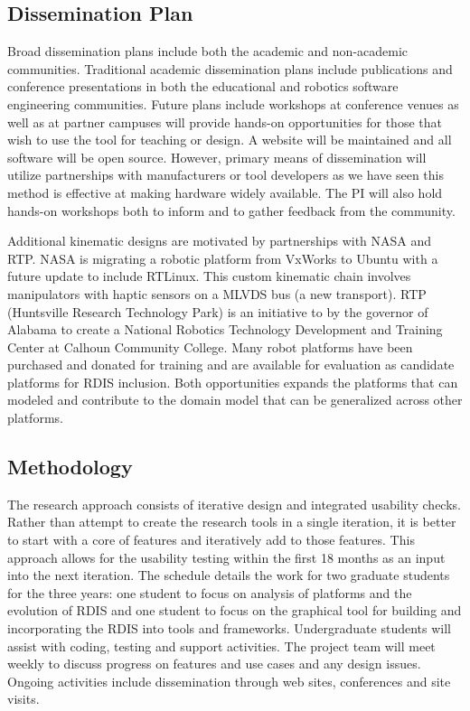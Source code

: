 \subsection{Dissemination Plan}
Broad dissemination plans include both the academic and non-academic communities.  Traditional academic dissemination plans include publications and conference presentations in both the educational and robotics software engineering communities.  Future plans include workshops at conference venues as well as at partner campuses will provide hands-on opportunities for those that wish to use the tool for teaching or design.  A website will be maintained and all software will be open source.  However, primary means of dissemination will utilize partnerships with manufacturers or tool developers as we have seen this method is effective at making hardware widely available.  The PI will also hold hands-on workshops both to inform and to gather feedback from the community.  

Additional kinematic designs are motivated by partnerships with NASA and RTP.  NASA is migrating a robotic platform from VxWorks to Ubuntu with a future update to include RTLinux.  This custom kinematic chain involves manipulators with haptic sensors on a MLVDS bus (a new transport).  RTP (Huntsville Research Technology Park) is an initiative to by the governor of Alabama to create a National Robotics Technology Development and Training Center at Calhoun Community College.  Many robot platforms have been purchased and donated for training and are available for evaluation as candidate platforms for RDIS inclusion.  Both opportunities expands the platforms that can modeled and contribute to the domain model that can be generalized across other platforms. 

\subsection{Methodology}
The research approach consists of iterative design and integrated usability checks.  Rather than attempt to create the research tools in a single iteration, it is better to start with a core of features and iteratively add to those features. This approach allows for the usability testing within the first 18 months as an input into the next iteration.  The schedule details the work for two graduate students for the three years: one student to focus on analysis of platforms and the evolution of RDIS and one student to focus on the graphical tool for building and incorporating the RDIS into tools and frameworks.  Undergraduate students will assist with coding, testing and support activities.  The project team will meet weekly to discuss progress on features and use cases and any design issues.  Ongoing activities include dissemination through web sites, conferences and site visits.    

